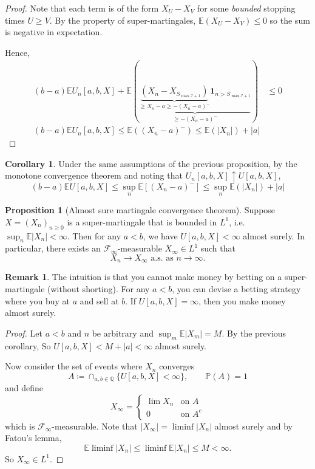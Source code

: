 \documentclass[parskip=full]{article}
\theoremstyle{definition}
\newtheorem{corollary}{Corollary}
\newtheorem{proposition}{Proposition}[section]
\newtheorem*{remark}{Remark}
\newcommand{\Q}{\mathbb{Q}}
\newcommand{\Pbb}{\mathbb{P}}
\newcommand{\1}{\mathbbm{1}}
\newcommand{\E}{\mathbb{E}}
\begin{document}
\begin{proof}
  Note that each term is of the form $X_U - X_V$ for some \emph{bounded} stopping times $U \geq V$. By the property of super-martingales, $\E(X_U - X_V) \leq 0$ so the sum is negative in expectation.

  Hence, 
  \begin{align*}
    (b - a) \E U_n[a, b, X] + \E(\underbrace{\underbrace{(X_n - X_{S_{\max \mathcal{I} + 1}})}_{
      \geq X_n - a \geq -(X_n - a)^-} \mathbf{1}_{n > S_{\max \mathcal{I} + 1}}}_{\geq -(X_n - a)^-}) &\leq 0 \\
    (b - a) \E U_n[a, b, X]  \leq  \E((X_n - a)^-) \leq \E(|X_n|) + |a|
  \end{align*}
\end{proof}

\begin{corollary} \label{Upcrossing corollary}
  Under the same assumptions of the previous proposition, by the monotone convergence theorem and noting that $U_n[a, b, X] \uparrow U[a, b, X]$,
  \[
    (b - a) \E U[a, b, X] \leq \sup_n \E[(X_n - a)^-] \leq \sup_n \E(|X_n|) + |a|
  \]
\end{corollary}

\begin{proposition}[Almost sure martingale convergence theorem] \label{almost sure martingale convergence theorem}
  Suppose $X = (X_n)_{n \geq 0}$ is a super-martingale that is bounded in $L^1$, i.e.\ $\sup_n \E|X_n| < \infty$. Then for any $a < b$, we have $U[a, b, X] < \infty$ almost surely. In particular, there exists an $\mathcal{F}_\infty$-measurable $X_\infty \in L^1$ such that
  \[
    X_n \to X_\infty\text{ a.s. as }n \to \infty.
  \]
\end{proposition}

\begin{remark}
  The intuition is that you cannot make money by betting on a super-martingale (without shorting). For any $a < b$, you can devise a betting strategy where you buy at $a$ and sell at $b$. If $U[a, b, X] = \infty$, then you make money almost surely.
\end{remark}

\begin{proof}
  Let $a < b$ and $n$ be arbitrary and $\sup_m \E|X_m| = M$. By the previous corollary,
  So $U[a, b, X] < M + |a| < \infty$ almost surely.

  Now consider the set of events where $X_n$ converges
  \[
    A \coloneqq \cap_{a, b \in \Q} \{U[a, b, X] < \infty\}, \qquad \Pbb (A) = 1
  \]
  and define
  \[
    X_\infty = \begin{cases}
      \lim X_n & \text{on } A \\
      0           & \text{on } A^c
    \end{cases}
  \]
  which is $\mathcal{F}_\infty$-measurable. Note that $|X_\infty| = \liminf |X_n|$ almost surely and by Fatou's lemma,
  \[
    \E \liminf |X_n| \leq \liminf \E|X_n| \leq M < \infty.
  \]
  So $X_\infty \in L^1$.
\end{proof}
\end{document}
